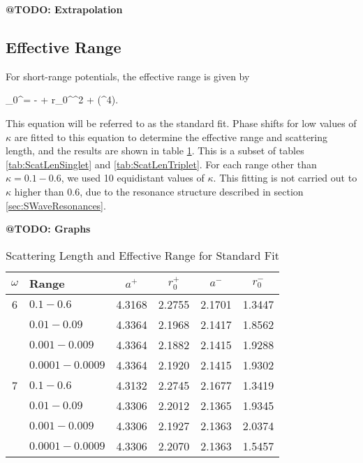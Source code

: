 \documentclass[Dissertation.tex]{subfiles}
\begin{document}
\textbf{@TODO: Extrapolation}


\subsection{Effective Range}
For short-range potentials, the effective range is given by \cite{Bethe1949,Blatt1949,Drake2006}

\beq
\label{eq:EffectiveRangeShort}
\kappa \cot\eta_0^\pm = - +  r_0^\pm \kappa^2 + (\kappa^4).
\eeq

\noindent This equation will be referred to as the standard fit. Phase shifts for low values of $\kappa$ are fitted to this equation to determine the effective range and scattering length, and the results are shown in table \ref{tab:ScatLenStandard}. This is a subset of tables \ref{tab:ScatLenSinglet} and \ref{tab:ScatLenTriplet}. For each range other than $\kappa = 0.1 - 0.6$, we used 10 equidistant values of $\kappa$. This fitting is not carried out to $\kappa$ higher than 0.6, due to the resonance structure described in section \ref{sec:SWaveResonances}.

\textbf{@TODO: Graphs}

\begin{table}[H]
\begin{center}
\begin{tabular}{c l c c c c}
\toprule
$\omega$ & Range & $a^+$ & $r_0^+$ & $a^-$ & $r_0^-$ \\
\midrule
6 & $0.1 - 0.6$ & 4.3168 & 2.2755 & 2.1701 & 1.3447 \\
  & $0.01 - 0.09$ & 4.3364 & 2.1968 & 2.1417 & 1.8562 \\
  & $0.001 - 0.009$ & 4.3364 & 2.1882 & 2.1415 & 1.9288 \\
  & $0.0001 - 0.0009$ & 4.3364 & 2.1920 & 2.1415 & 1.9302 \\
\midrule
7 & $0.1 - 0.6$ & 4.3132 & 2.2745 & 2.1677 & 1.3419 \\
  & $0.01 - 0.09$ & 4.3306 & 2.2012 & 2.1365 & 1.9345 \\
  & $0.001 - 0.009$ & 4.3306 & 2.1927 & 2.1363 & 2.0374 \\
  & $0.0001 - 0.0009$ & 4.3306 & 2.2070 & 2.1363 & 1.5457 \\
\bottomrule
\end{tabular}
\caption{Scattering Length and Effective Range for Standard Fit}
\label{tab:ScatLenStandard}
\end{center}
\end{table}
\end{document}
